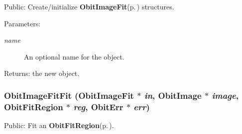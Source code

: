 Public: Create/initialize {\bf Obit\-Image\-Fit}{\rm (p.\,\pageref{structObitImageFit})} structures. 

\begin{Desc}
\item[Parameters:]
\begin{description}
\item[{\em name}]An optional name for the object. \end{description}
\end{Desc}
\begin{Desc}
\item[Returns:]the new object. \end{Desc}
\subsubsection{ Obit\-Image\-Fit\-Fit ({\bf Obit\-Image\-Fit} $\ast$ {\em in}, {\bf Obit\-Image} $\ast$ {\em image}, {\bf Obit\-Fit\-Region} $\ast$ {\em reg}, {\bf Obit\-Err} $\ast$ {\em err})}\label{ObitImageFit_8c_a13}


Public: Fit an {\bf Obit\-Fit\-Region}{\rm (p.\,\pageref{structObitFitRegion})}. 


